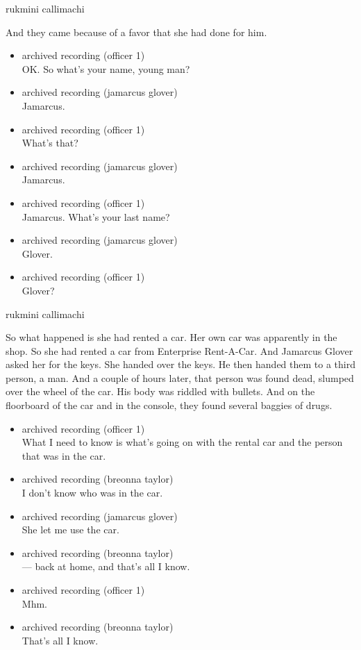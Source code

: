 rukmini callimachi

And they came because of a favor that she had done for him.

\begin{itemize}
\item
  archived recording (officer 1)\\
  OK. So what's your name, young man?
\item
  archived recording (jamarcus glover)\\
  Jamarcus.
\item
  archived recording (officer 1)\\
  What's that?
\item
  archived recording (jamarcus glover)\\
  Jamarcus.
\item
  archived recording (officer 1)\\
  Jamarcus. What's your last name?
\item
  archived recording (jamarcus glover)\\
  Glover.
\item
  archived recording (officer 1)\\
  Glover?
\end{itemize}

rukmini callimachi

So what happened is she had rented a car. Her own car was apparently in
the shop. So she had rented a car from Enterprise Rent-A-Car. And
Jamarcus Glover asked her for the keys. She handed over the keys. He
then handed them to a third person, a man. And a couple of hours later,
that person was found dead, slumped over the wheel of the car. His body
was riddled with bullets. And on the floorboard of the car and in the
console, they found several baggies of drugs.

\begin{itemize}
\item
  archived recording (officer 1)\\
  What I need to know is what's going on with the rental car and the
  person that was in the car.
\item
  archived recording (breonna taylor)\\
  I don't know who was in the car.
\item
  archived recording (jamarcus glover)\\
  She let me use the car.
\item
  archived recording (breonna taylor)\\
  --- back at home, and that's all I know.
\item
  archived recording (officer 1)\\
  Mhm.
\item
  archived recording (breonna taylor)\\
  That's all I know.
\end{itemize}

